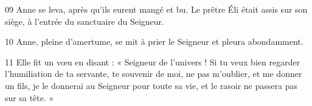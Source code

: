 
09 Anne se leva, après qu’ils eurent mangé et bu. Le prêtre Éli était assis sur son siège, à l’entrée du sanctuaire du Seigneur.

10 Anne, pleine d’amertume, se mit à prier le Seigneur et pleura abondamment.

11 Elle fit un vœu en disant : « Seigneur de l’univers ! Si tu veux bien regarder l’humiliation de ta servante, te souvenir de moi, ne pas m’oublier, et me donner un fils, je le donnerai au Seigneur pour toute sa vie, et le rasoir ne passera pas sur sa tête. »